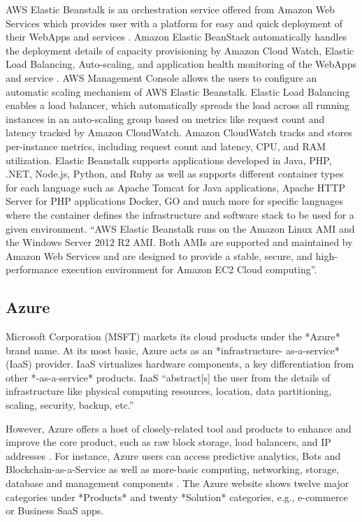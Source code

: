     AWS Elastic Beanstalk is an orchestration service offered from
    Amazon Web Services which provides user with a platform for easy
    and quick deployment of their WebApps and services
    \cite{www-amazon-elastic-beanstalk}. Amazon Elastic BeanStack
    automatically handles the deployment details of capacity
    provisioning by Amazon Cloud Watch, Elastic Load Balancing,
    Auto-scaling, and application health monitoring of the WebApps and
    service \cite{amazon-elastic-beanstalk-book}. AWS Management
    Console allows the users to configure an automatic scaling
    mechanism of AWS Elastic Beanstalk. Elastic Load Balancing enables
    a load balancer, which automatically spreads the load across all
    running instances in an auto-scaling group based on metrics like
    request count and latency tracked by Amazon CloudWatch. Amazon
    CloudWatch tracks and stores per-instance metrics, including
    request count and latency, CPU, and RAM utilization. Elastic
    Beanstalk supports applications developed in Java, PHP, .NET,
    Node.js, Python, and Ruby as well as supports different container
    types for each language such as Apache Tomcat for Java
    applications, Apache HTTP Server for PHP applications Docker, GO
    and much more for specific languages where the container defines
    the infrastructure and software stack to be used for a given
    environment. ``AWS Elastic Beanstalk runs on the Amazon Linux AMI
    and the Windows Server 2012 R2 AMI. Both AMIs are supported and
    maintained by Amazon Web Services and are designed to provide a
    stable, secure, and high-performance execution environment for
    Amazon EC2 Cloud computing''\cite{www-amazon-elastic-beanstalk}.

\subsection{Azure}

    Microsoft Corporation (MSFT) markets its cloud products under the
    *Azure* brand name. At its most basic, Azure acts as an
    *infrastructure- as-a-service* (IaaS) provider.  IaaS virtualizes
    hardware components, a key differentiation from other
    *-as-a-service* products. IaaS ``abstract[s] the user from the
    details of infrastructure like physical computing resources,
    location, data partitioning, scaling, security, backup, etc.''
    \cite{www-wikipedia-cloud}

    However, Azure offers a host of closely-related tool and products
    to enhance and improve the core product, such as raw block
    storage, load balancers, and IP addresses
    \cite{www-azure-msft}. For instance, Azure users can access
    predictive analytics, Bots and Blockchain-as-a-Service
    \cite{www-azure-msft} as well as more-basic computing,
    networking, storage, database and management components
    \cite{www-sec-edgar-msft}.  The Azure website shows twelve major
    categories under *Products* and twenty *Solution* categories,
    e.g., e-commerce or Business SaaS apps.

